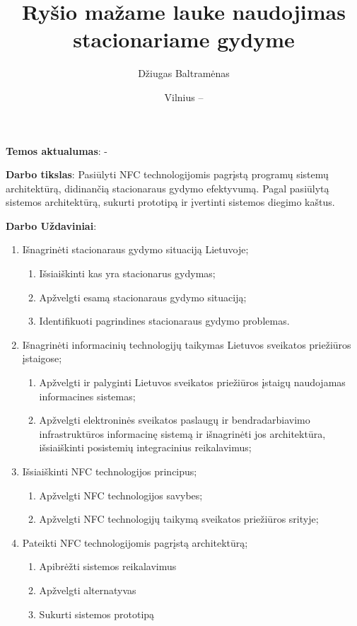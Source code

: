 \documentclass{VUMIFPSbakalaurinis}
\title{Ryšio mažame lauke naudojimas stacionariame gydyme}
\author{Džiugas Baltramėnas}
\date{Vilnius – \the\year}
\begin{document}
\maketitle

\tableofcontents

    \textbf{Temos aktualumas}: -

    \textbf{Darbo tikslas}: Pasiūlyti NFC technologijomis pagrįstą programų sistemų architektūrą, didinančią stacionaraus gydymo efektyvumą. Pagal pasiūlytą sistemos architektūrą, sukurti prototipą ir įvertinti sistemos diegimo kaštus.
    
    \textbf{Darbo Uždaviniai}:
    \begin{enumerate}
        \item Išnagrinėti stacionaraus gydymo situaciją Lietuvoje;
        \begin{enumerate}
            \item Išsiaiškinti kas yra stacionarus gydymas;
            \item Apžvelgti esamą stacionaraus gydymo situaciją;
            \item Identifikuoti pagrindines stacionaraus gydymo problemas.
        \end{enumerate}
        \item Išnagrinėti informacinių technologijų taikymas Lietuvos sveikatos priežiūros įstaigose;
        \begin{enumerate}
            \item Apžvelgti ir palyginti Lietuvos sveikatos priežiūros įstaigų naudojamas informacines sistemas;
            \item Apžvelgti elektroninės sveikatos paslaugų ir bendradarbiavimo infrastruktūros informacinę sistemą ir išnagrinėti jos architektūra, išsiaiškinti posistemių integracinius reikalavimus;
        \end{enumerate}
        \item Išsiaiškinti NFC technologijos principus;
        \begin{enumerate}
            \item Apžvelgti NFC technologijos savybes;
            \item Apžvelgti NFC technologijų taikymą sveikatos priežiūros srityje;
        \end{enumerate}
        \item Pateikti NFC technologijomis pagrįstą architektūrą;
        \begin{enumerate}
            \item Apibrėžti sistemos reikalavimus
            \item Apžvelgti alternatyvas
            \item Sukurti sistemos prototipą
        \end{enumerate}
    \end{enumerate}
\end{document}
